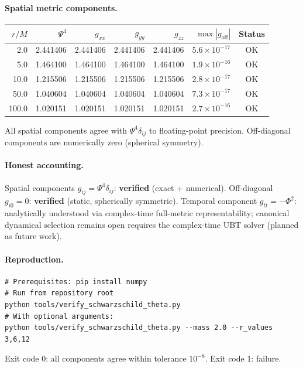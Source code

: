 \documentclass[12pt,a4paper]{article}
\theoremstyle{definition}
\theoremstyle{remark}
\begin{document}
\paragraph{Spatial metric components.}

\begin{center}
\begin{tabular}{rrrrrrc}
\toprule
$r/M$ & $\Psi^4$ & $g_{xx}$ & $g_{yy}$ & $g_{zz}$ & $\max|g_\mathrm{off}|$ & Status \\
\midrule
2.0   & 2.441406 & 2.441406 & 2.441406 & 2.441406 & $5.6\times10^{-17}$ & OK \\
5.0   & 1.464100 & 1.464100 & 1.464100 & 1.464100 & $1.9\times10^{-16}$ & OK \\
10.0  & 1.215506 & 1.215506 & 1.215506 & 1.215506 & $2.8\times10^{-17}$ & OK \\
50.0  & 1.040604 & 1.040604 & 1.040604 & 1.040604 & $7.3\times10^{-17}$ & OK \\
100.0 & 1.020151 & 1.020151 & 1.020151 & 1.020151 & $2.7\times10^{-16}$ & OK \\
\bottomrule
\end{tabular}
\end{center}

All spatial components agree with $\Psi^4\delta_{ij}$ to floating-point precision.
Off-diagonal components are numerically zero (spherical symmetry).

\paragraph{Honest accounting.}
Spatial components $g_{ij} = \Psi^4\delta_{ij}$: \textbf{verified} (exact + numerical).
Off-diagonal $g_{i0} = 0$: \textbf{verified} (static, spherically symmetric).
Temporal component $g_{tt} = -\Phi^2$: analytically understood via complex-time
full-metric representability; canonical dynamical selection remains open
requires the complex-time UBT solver (planned as future work).

\paragraph{Reproduction.}
\begin{verbatim}
# Prerequisites: pip install numpy
# Run from repository root
python tools/verify_schwarzschild_theta.py
# With optional arguments:
python tools/verify_schwarzschild_theta.py --mass 2.0 --r_values 3,6,12
\end{verbatim}
Exit code 0: all components agree within tolerance $10^{-8}$.
Exit code 1: failure.
\end{document}
